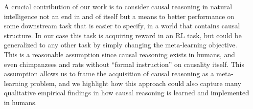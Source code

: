



A crucial contribution of our work is to consider causal reasoning in natural intelligence not an end in and of itself but a means to better performance on some downstream task that is easier to specify, in a world that contains causal structure. In our case this task is acquiring reward in an RL task, but could be generalized to any other task by simply changing the meta-learning objective. This is a reasonable assumption since causal reasoning exists in humans, and even chimpanzees and rats \citep{blaisdell2006causal,gopnik2004theory,premack1994levels} without ``formal instruction'' on causality itself. This assumption allows us to frame the acquisition of causal reasoning as a meta-learning problem, and we highlight how this approach could also capture many qualitative empirical findings in how causal reasoning is learned and implemented in humans.

